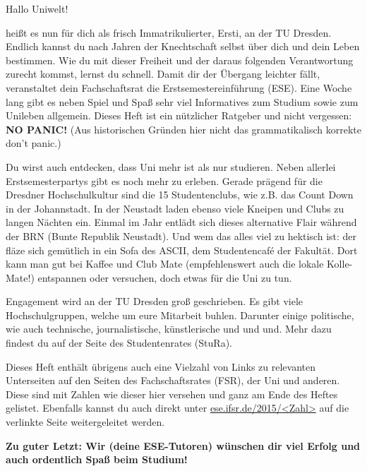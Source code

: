 
Hallo Uniwelt!

heißt es nun für dich als frisch Immatrikulierter, Ersti, an der TU Dresden. 
Endlich kannst du nach Jahren der Knechtschaft selbst über dich und dein Leben bestimmen. 
Wie du mit dieser Freiheit und der daraus folgenden Verantwortung zurecht kommst, lernst du schnell. 
Damit dir der Übergang leichter fällt, veranstaltet dein Fachschaftsrat die Erstsemestereinführung (ESE). 
Eine Woche lang gibt es neben Spiel und Spaß sehr viel Informatives zum Studium sowie zum Unileben allgemein. 
Dieses Heft ist ein nützlicher Ratgeber und nicht vergessen: 
\textbf{NO PANIC!} (Aus historischen Gründen hier nicht das grammatikalisch korrekte \glqq don't panic\grqq.)

Du wirst auch entdecken, dass Uni mehr ist als nur studieren. 
Neben allerlei Erstsemesterpartys gibt es noch mehr zu erleben. 
Gerade prägend für die Dresdner Hochschulkultur sind die 15 Studentenclubs, wie z.B. das Count Down in der Johannstadt. 
In der Neustadt laden ebenso viele Kneipen und Clubs zu langen Nächten ein. 
Einmal im Jahr entlädt sich dieses alternative Flair während der BRN (Bunte Republik Neustadt). 
Und wem das alles viel zu hektisch ist: der fläze sich gemütlich in ein Sofa des ASCII, dem Studentencafé der Fakultät. 
Dort kann man gut bei Kaffee und Club Mate (empfehlenswert auch die lokale Kolle-Mate!) entspannen oder versuchen, doch etwas für die Uni zu tun.

Engagement wird an der TU Dresden groß geschrieben. 
Es gibt viele Hochschulgruppen, welche um eure Mitarbeit buhlen. 
Darunter einige politische, wie auch technische, journalistische, künstlerische und und und. Mehr dazu findest du auf der Seite des Studentenrates (StuRa).

Dieses Heft enthält übrigens auch eine Vielzahl von Links zu relevanten Unterseiten auf den Seiten des Fachschaftsrates (FSR), der Uni und anderen. 
Diese sind mit Zahlen wie dieser hier  versehen und ganz am Ende des Heftes gelistet. Ebenfalls kannst du auch direkt unter \url{ese.ifsr.de/2015/<Zahl>} auf die verlinkte Seite weitergeleitet werden.

\textbf{Zu guter Letzt: Wir (deine ESE-Tutoren) wünschen dir viel Erfolg und auch ordentlich Spaß beim Studium!}
